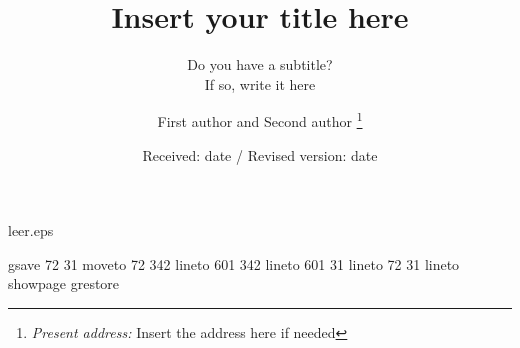 %
%
%
%
\begin{filecontents}{leer.eps}

gsave
72 31 moveto
72 342 lineto
601 342 lineto
601 31 lineto
72 31 lineto
showpage
grestore
\end{filecontents}
%
\documentclass[granma,referee]{svjour}
%
\usepackage{graphics}
%

%
\title{Insert your title here}
\subtitle{Do you have a subtitle?\\ If so, write it here}
\author{First author and Second author%
\thanks{\emph{Present address:} Insert the address here if needed}%
}                     %
%
\offprints{}          %
%
%
\date{Received: date / Revised version: date}
%
\maketitle
%
\begin{abstract}
Insert your abstract here.
\end{abstract}
%
\section{Introduction}
\label{intro}
Your text comes here. Separate text sections with
\section{Section title}
\label{sec:1}
and \cite{RefJ}
